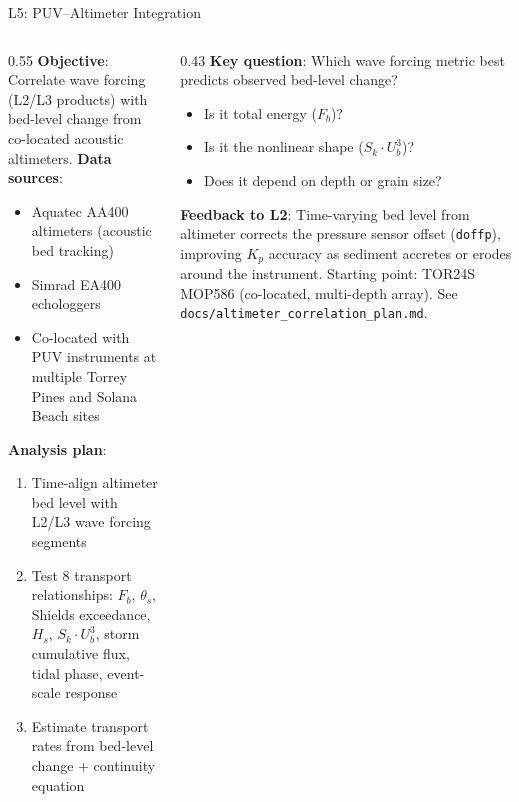 \documentclass[10pt, aspectratio=169]{beamer}
\begin{document}
\begin{frame}{L5: PUV--Altimeter Integration}
  \begin{columns}[T]
    \begin{column}{0.55\textwidth}
      \textbf{Objective}: Correlate wave forcing (L2/L3 products)
      with bed-level change from co-located acoustic altimeters.
      \vspace{0.5em}
      \textbf{Data sources}:
      \begin{itemize}
        \item Aquatec AA400 altimeters (acoustic bed tracking)
        \item Simrad EA400 echologgers
        \item Co-located with PUV instruments at multiple
              Torrey Pines and Solana Beach sites
      \end{itemize}
      \vspace{0.5em}
      \textbf{Analysis plan}:
      \begin{enumerate}
        \item Time-align altimeter bed level with L2/L3 wave
              forcing segments
        \item Test 8 transport relationships: $F_b$, $\theta_s$,
              Shields exceedance, $H_s$, $S_k \cdot U_b^3$,
              storm cumulative flux, tidal phase, event-scale
              response
        \item Estimate transport rates from bed-level change
              + continuity equation
      \end{enumerate}
    \end{column}
    \begin{column}{0.43\textwidth}
      \textbf{Key question}: Which wave forcing metric best
      predicts observed bed-level change?
      \vspace{0.5em}
      \begin{itemize}
        \item Is it total energy ($F_b$)?
        \item Is it the nonlinear shape ($S_k \cdot U_b^3$)?
        \item Does it depend on depth or grain size?
      \end{itemize}
      \vspace{0.5em}
      \textbf{Feedback to L2}: Time-varying bed level from
      altimeter corrects the pressure sensor offset
      (\texttt{doffp}), improving $K_p$ accuracy as
      sediment accretes or erodes around the instrument.
      \vspace{0.5em}
      {\footnotesize Starting point: TOR24S MOP586 (co-located,
      multi-depth array). See
      \texttt{docs/altimeter\_correlation\_plan.md}.}
    \end{column}
  \end{columns}
\end{frame}
\end{document}
